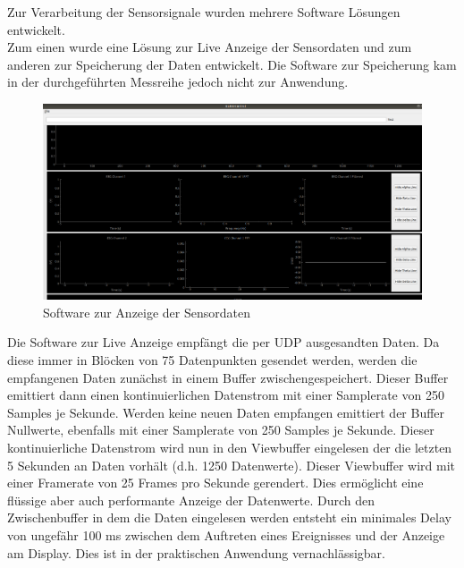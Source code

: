 

Zur Verarbeitung der Sensorsignale wurden mehrere Software Lösungen entwickelt.\\

Zum einen wurde eine Lösung zur Live Anzeige der Sensordaten und zum anderen zur Speicherung der Daten entwickelt. Die Software zur Speicherung kam in der durchgeführten Messreihe jedoch nicht zur Anwendung.\\

\begin{figure}[h]
    \centering
\begin{minipage}[t]{0.9\textwidth}
\includegraphics[width=\textwidth]{Images/screenshot_liveview.png}
\end{minipage}
    \caption{Software zur Anzeige der Sensordaten}
    \label{fig:screen_sensor}
\end{figure}

Die Software zur Live Anzeige empfängt die per UDP ausgesandten Daten. Da diese immer in Blöcken von 75 Datenpunkten gesendet werden, werden die empfangenen Daten zunächst in einem Buffer zwischengespeichert. Dieser Buffer emittiert dann einen kontinuierlichen Datenstrom mit einer Samplerate von 250 Samples je Sekunde. Werden keine neuen Daten empfangen emittiert der Buffer Nullwerte, ebenfalls mit einer Samplerate von 250 Samples je Sekunde.  Dieser kontinuierliche Datenstrom wird nun in den Viewbuffer eingelesen der die letzten 5 Sekunden an Daten vorhält (d.h. 1250 Datenwerte). Dieser Viewbuffer wird mit einer Framerate von 25 Frames pro Sekunde gerendert. Dies ermöglicht eine flüssige aber auch performante Anzeige der Datenwerte. Durch den Zwischenbuffer in dem die Daten eingelesen werden entsteht ein minimales Delay von ungefähr 100 ms zwischen dem Auftreten eines Ereignisses und der Anzeige am Display. Dies ist in der praktischen Anwendung vernachlässigbar. \\


